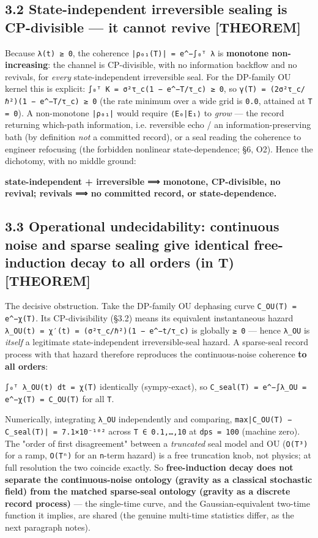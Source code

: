 \documentclass[11pt]{article}
\begin{document}
\subsection*{3.2 State-independent irreversible sealing is CP-divisible — it cannot revive [THEOREM]}
Because \texttt{λ(t) ≥ 0}, the coherence \texttt{|ρ₀₁(T)| = e\textasciicircum{}{−∫₀ᵀ λ}} is \textbf{monotone non-increasing}: the channel is CP-divisible, with no information backflow and no revivals, for \emph{every} state-independent irreversible seal. For the DP-family OU kernel this is explicit: \texttt{∫₀ᵀ K = σ²τ\_c(1 − e\textasciicircum{}{−T/τ\_c}) ≥ 0}, so \texttt{γ(T) = (2σ²τ\_c/ℏ²)(1 − e\textasciicircum{}{−T/τ\_c}) ≥ 0} (the rate minimum over a wide grid is \texttt{0.0}, attained at \texttt{T = 0}). A non-monotone \texttt{|ρ₀₁|} would require \texttt{⟨E₀|E₁⟩} to \emph{grow} — the record returning which-path information, i.e. reversible echo / an information-preserving bath (by definition \emph{not} a committed record), or a seal reading the coherence to engineer refocusing (the forbidden nonlinear state-dependence; §6, O2). Hence the dichotomy, with no middle ground:

\textbf{state-independent + irreversible ⟹ monotone, CP-divisible, no revival;  revivals ⟹ no committed record, or state-dependence.}

\subsection*{3.3 Operational undecidability: continuous noise and sparse sealing give identical free-induction decay to all orders (in T) [THEOREM]}
The decisive obstruction. Take the DP-family OU dephasing curve \texttt{C\_OU(T) = e\textasciicircum{}{−χ(T)}}. Its CP-divisibility (§3.2) means its equivalent instantaneous hazard \texttt{λ\_OU(t) = χ′(t) = (σ²τ\_c/ℏ²)(1 − e\textasciicircum{}{−t/τ\_c})} is globally \texttt{≥ 0} — hence \texttt{λ\_OU} is \emph{itself} a legitimate state-independent irreversible-seal hazard. A sparse-seal record process with that hazard therefore reproduces the continuous-noise coherence \textbf{to all orders}:

\texttt{∫₀ᵀ λ\_OU(t) dt = χ(T)} identically (sympy-exact), so \texttt{C\_seal(T) = e\textasciicircum{}{−∫λ\_OU} = e\textasciicircum{}{−χ(T)} = C\_OU(T)} for all \texttt{T}.

Numerically, integrating \texttt{λ\_OU} independently and comparing, \texttt{max|C\_OU(T) − C\_seal(T)| = 7.1×10⁻¹⁰²} across \texttt{T ∈ {0.1,…,10}} at \texttt{dps = 100} (machine zero). The "order of first disagreement" between a \emph{truncated} seal model and OU (\texttt{O(T³)} for a ramp, \texttt{O(Tⁿ)} for an \texttt{n}-term hazard) is a free truncation knob, not physics; at full resolution the two coincide exactly. So \textbf{free-induction decay does not separate the continuous-noise ontology (gravity as a classical stochastic field) from the matched sparse-seal ontology (gravity as a discrete record process)} — the single-time curve, and the Gaussian-equivalent two-time function it implies, are shared (the genuine multi-time statistics differ, as the next paragraph notes).
\end{document}
